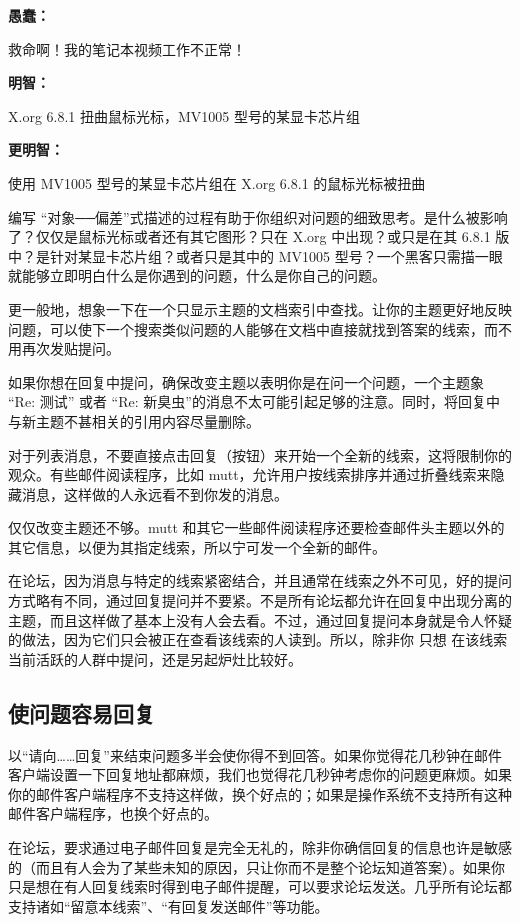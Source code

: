 \textbf{愚蠢：}

救命啊！我的笔记本视频工作不正常！

\textbf{明智：}


X.org 6.8.1 扭曲鼠标光标，MV1005 型号的某显卡芯片组

\textbf{更明智：}



使用 MV1005 型号的某显卡芯片组在 X.org 6.8.1 的鼠标光标被扭曲

编写 “对象──偏差”式描述的过程有助于你组织对问题的细致思考。是什么被影响了？仅仅是鼠标光标或者还有其它图形？只在 X.org 中出现？或只是在其 6.8.1 版中？是针对某显卡芯片组？或者只是其中的 MV1005 型号？一个黑客只需描一眼就能够立即明白什么是你遇到的问题，什么是你自己的问题。

更一般地，想象一下在一个只显示主题的文档索引中查找。让你的主题更好地反映问题，可以使下一个搜索类似问题的人能够在文档中直接就找到答案的线索，而不用再次发贴提问。

如果你想在回复中提问，确保改变主题以表明你是在问一个问题，一个主题象 “Re: 测试” 或者 “Re: 新臭虫”的消息不太可能引起足够的注意。同时，将回复中与新主题不甚相关的引用内容尽量删除。

对于列表消息，不要直接点击回复（按钮）来开始一个全新的线索，这将限制你的观众。有些邮件阅读程序，比如 mutt，允许用户按线索排序并通过折叠线索来隐藏消息，这样做的人永远看不到你发的消息。

仅仅改变主题还不够。mutt 和其它一些邮件阅读程序还要检查邮件头主题以外的其它信息，以便为其指定线索，所以宁可发一个全新的邮件。

在论坛，因为消息与特定的线索紧密结合，并且通常在线索之外不可见，好的提问方式略有不同，通过回复提问并不要紧。不是所有论坛都允许在回复中出现分离的主题，而且这样做了基本上没有人会去看。不过，通过回复提问本身就是令人怀疑的做法，因为它们只会被正在查看该线索的人读到。所以，除非你 只想 在该线索当前活跃的人群中提问，还是另起炉灶比较好。




\subsection{使问题容易回复}


以“请向……回复”来结束问题多半会使你得不到回答。如果你觉得花几秒钟在邮件客户端设置一下回复地址都麻烦，我们也觉得花几秒钟考虑你的问题更麻烦。如果你的邮件客户端程序不支持这样做，换个好点的；如果是操作系统不支持所有这种邮件客户端程序，也换个好点的。

在论坛，要求通过电子邮件回复是完全无礼的，除非你确信回复的信息也许是敏感的（而且有人会为了某些未知的原因，只让你而不是整个论坛知道答案）。如果你只是想在有人回复线索时得到电子邮件提醒，可以要求论坛发送。几乎所有论坛都支持诸如“留意本线索”、“有回复发送邮件”等功能。



